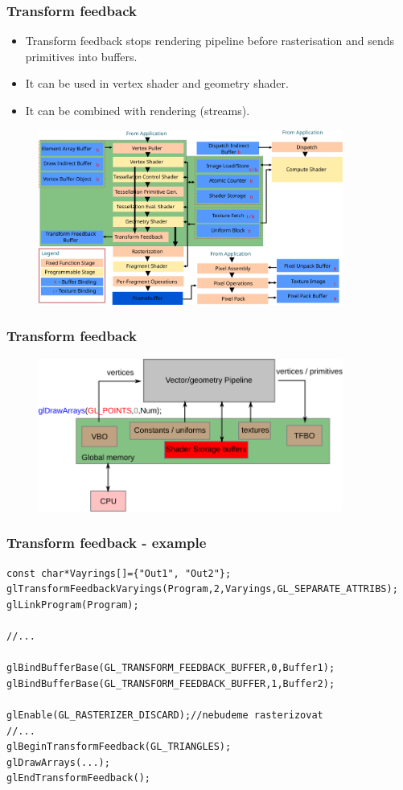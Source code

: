 \begin{frame}
\frametitle{Transform feedback}
	\begin{itemize}
  \item Transform feedback stops rendering pipeline before rasterisation and sends primitives into buffers.
	\item It can be used in vertex shader and geometry shader.
  \item It can be combined with rendering (streams).
	\end{itemize}
	\begin{figure}[h]
	\includegraphics[width=10cm,keepaspectratio]{pics/tf_pipeline}
	\end{figure}
\end{frame}

\begin{frame}
\frametitle{Transform feedback}
	\begin{figure}[h]
	\includegraphics[width=10cm,keepaspectratio]{pics/tf_mem}
	\end{figure}
\end{frame}

\begin{frame}[fragile]
\frametitle{Transform feedback - example}
	{\scriptsize
	\begin{verbatim}
const char*Vayrings[]={"Out1", "Out2"};
glTransformFeedbackVaryings(Program,2,Varyings,GL_SEPARATE_ATTRIBS);
glLinkProgram(Program);

//...

glBindBufferBase(GL_TRANSFORM_FEEDBACK_BUFFER,0,Buffer1);
glBindBufferBase(GL_TRANSFORM_FEEDBACK_BUFFER,1,Buffer2);

glEnable(GL_RASTERIZER_DISCARD);//nebudeme rasterizovat
//...
glBeginTransformFeedback(GL_TRIANGLES);
glDrawArrays(...);
glEndTransformFeedback();
	\end{verbatim}
	}
\end{frame}

